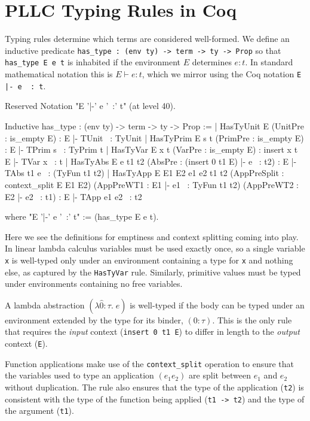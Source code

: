 \documentclass[]{unswthesis}
\newcommand{\types}{\vdash}
\let\c\texttt
\let\i\textit
\begin{document}
\section{PLLC Typing Rules in Coq}
\label{app:pllc-typing-rules}

Typing rules determine which terms are considered well-formed. We define an inductive predicate \c{has_type : (env ty) -> term -> ty -> Prop} so that \c{has_type E e t} is inhabited if the environment $E$ determines $e : t$. In standard mathematical notation this is $E \types e : t$, which we mirror using the Coq notation \c{E |- e ~: t}.

\begin{coqcode}
Reserved Notation "E '|-' e '~:' t" (at level 40).

Inductive has_type : (env ty) -> term -> ty -> Prop :=
  | HasTyUnit E
      (UnitPre : is_empty E) :
      E |- TUnit ~: TyUnit
  | HasTyPrim E s t
      (PrimPre : is_empty E) :
      E |- TPrim s ~: TyPrim t
  | HasTyVar E x t
      (VarPre : is_empty E) :
      insert x t E |- TVar x ~: t
  | HasTyAbs E e t1 t2
      (AbsPre : (insert 0 t1 E) |- e ~: t2) :
      E |- TAbs t1 e ~: (TyFun t1 t2)
  | HasTyApp E E1 E2 e1 e2 t1 t2
      (AppPreSplit : context_split E E1 E2)
      (AppPreWT1 : E1 |- e1 ~: TyFun t1 t2)
      (AppPreWT2 : E2 |- e2 ~: t1) :
      E  |- TApp e1 e2 ~: t2

where "E '|-' e '~:' t" := (has_type E e t).
\end{coqcode}

Here we see the definitions for emptiness and context splitting coming into play. In linear lambda calculus variables must be used exactly once, so a single variable \c{x} is well-typed only under an environment containing a type for \c{x} and nothing else, as captured by the \c{HasTyVar} rule. Similarly, primitive values must be typed under environments containing no free variables.

A lambda abstraction $(\lambda \hat{0} : \tau. \; e)$ is well-typed if the body can be typed under an environment extended by the type for its binder, $(0 : \tau)$. This is the only rule that requires the \i{input} context (\c{insert 0 t1 E}) to differ in length to the \i{output} context (\c{E}).

Function applications make use of the \c{context_split} operation to ensure that the variables used to type an application $(e_1 e_2)$ are split between $e_1$ and $e_2$ without duplication. The rule also ensures that the type of the application (\c{t2}) is consistent with the type of the function being applied (\c{t1 -> t2}) and the type of the argument (\c{t1}).
\end{document}
